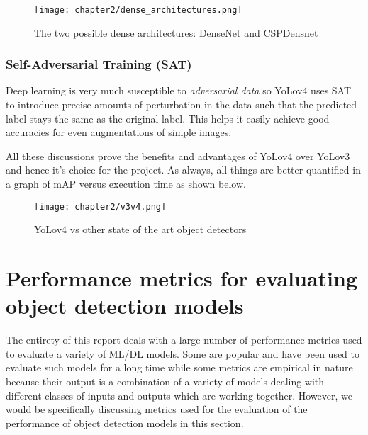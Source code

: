 \begin{figure}[h]
  \centering
    \texttt{[image: chapter2/dense\_architectures.png]}
  \caption{The two possible dense architectures: DenseNet and CSPDensnet}
  \label{fig:dense_arch}
\end{figure}

\subsubsection{Self-Adversarial Training (SAT)}
Deep learning is very much susceptible to \textit{adversarial data} so YoLov4 uses SAT to introduce precise amounts of perturbation in the data such that the predicted label stays the same as the original label. This helps it easily achieve good accuracies for even augmentations of simple images.

All these discussions prove the benefits and advantages of YoLov4 over YoLov3 and hence it's choice for the project. As always, all things are better quantified in a graph of mAP versus execution time as shown below.

\begin{figure}[h]
  \centering
  \texttt{[image: chapter2/v3v4.png]}
  \caption{YoLov4 vs other state of the art object detectors}
  \label{fig:v3_vs_v4}
\end{figure}


\section{Performance metrics for evaluating object detection models \cite{Koech2020}}  \label{metrics}

The entirety of this report deals with a large number of performance metrics used to evaluate a variety of ML/DL models. Some are popular and have been used to evaluate such models for a long time while some metrics are empirical in nature because their output is a combination of a variety of models dealing with different classes of inputs and outputs which are working together. However, we would be specifically discussing metrics used for the evaluation of the performance of object detection models in this section.
